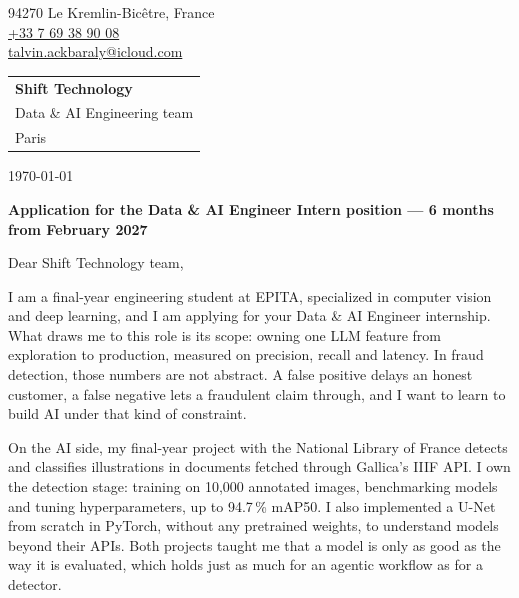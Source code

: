 \documentclass[11pt, a4paper]{extarticle}
\begin{document}
{\color{accent}\fontsize{22}{26}\selectfont\scshape{}}\par\vspace{3pt}
{\setlength{\parskip}{0pt}
94270 Le Kremlin-Bicêtre, France\\
\href{tel:+33769389008}{\textcolor{ink}{+33 7 69 38 90 08}}\\
\href{mailto:talvin.ackbaraly@icloud.com}{\textcolor{ink}{talvin.ackbaraly@icloud.com}}\par}
\vspace{-4pt}{\color{hair}\rule{\textwidth}{0.4pt}}\par

\vspace{2pt}
\hfill\begin{tabular}[t]{@{}l@{}}
  \textbf{Shift Technology}\\
  Data \& AI Engineering team\\
  Paris
\end{tabular}

\today

\vspace{2pt}
\textbf{Application for the Data \& AI Engineer Intern position — 6 months from February 2027}

\vspace{2pt}
Dear Shift Technology team,

\justifying
I am a final-year engineering student at EPITA, specialized in computer vision and deep learning,
and I am applying for your Data \& AI Engineer internship. What draws me to this role is its scope:
owning one LLM feature from exploration to production, measured on precision, recall and latency.
In fraud detection, those numbers are not abstract. A false positive delays an honest customer, a
false negative lets a fraudulent claim through, and I want to learn to build AI under that kind of
constraint.

On the AI side, my final-year project with the National Library of France detects and classifies
illustrations in documents fetched through Gallica's IIIF API. I own the detection stage: training
on 10,000 annotated images, benchmarking models and tuning hyperparameters, up to 94.7\,\% mAP50.
I also implemented a U-Net from scratch in PyTorch, without any pretrained weights, to understand
models beyond their APIs. Both projects taught me that a model is only as good as the way it is
evaluated, which holds just as much for an agentic workflow as for a detector.
\end{document}
